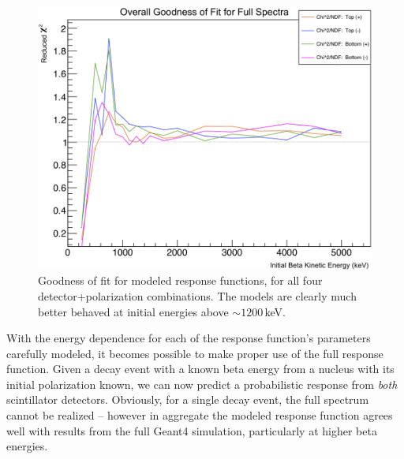 \begin{figure}[h!!tb]
	\centering
	\includegraphics[width=.999\linewidth]
	{Figures/Lineshape_Chi2.png}
	\caption[Goodness of Fit for Modeled Response Functions]{Goodness of fit for modeled response functions, for all four detector+polarization combinations.  The models are clearly much better behaved at initial energies above $\sim 1200\,$keV.}	
	\label{fig:lineshape_redchi2}
\end{figure}


With the energy dependence for each of the response function's parameters carefully modeled, it becomes possible to make proper use of the full response function.  Given a decay event with a known beta energy from a nucleus with its initial polarization known, we can now predict a probabilistic response from \emph{both} scintillator detectors.  Obviously, for a single decay event, the full spectrum cannot be realized -- however in aggregate the modeled response function agrees well with results from the full Geant4 simulation, particularly at higher beta energies.  





